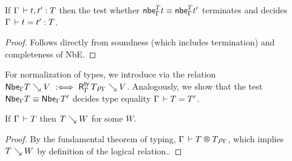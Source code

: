 \documentclass[acmlarge,review,anonymous]{acmart}\settopmatter{printfolios=true}
\begin{document}
\begin{corollary}
  If\/ $\Gamma \,\vdash t,t' : T$ then the test whether $\mathsf{nbe}_{\Gamma}^{T} t \equiv \mathsf{nbe}_{\Gamma}^{T}{t'}$
  terminates and
  decides $\Gamma \,\vdash t = t' : T$.
\end{corollary}
\begin{proof}
  Follows directly from soundness (which includes termination) and completeness of NbE.
\end{proof}

For normalization of types, we introduce 
via the relation $\mathsf{Nbe}_{\Gamma} T \searrow V \mathrel{\ :\Longleftrightarrow\ } \mathsf{R}^{\mathsf{ty}}_{\Gamma} \, T\rho_\Gamma \searrow V$.
Analogously, we show that the test $\mathsf{Nbe}_{\Gamma} T \equiv \mathsf{Nbe}_{\Gamma} T'$
decides type equality $\Gamma \,\vdash T = T'$.

\begin{corollary}
  If\/ $\Gamma \,\vdash T$ then $T \searrow W$ for some $W$.
\end{corollary}
\begin{proof}
  By the fundamental theorem of typing, $\RG \Gamma T {T\rhog}$,
  which implies $T \searrow W$ by definition of the logical relation..
\end{proof}
\end{document}
